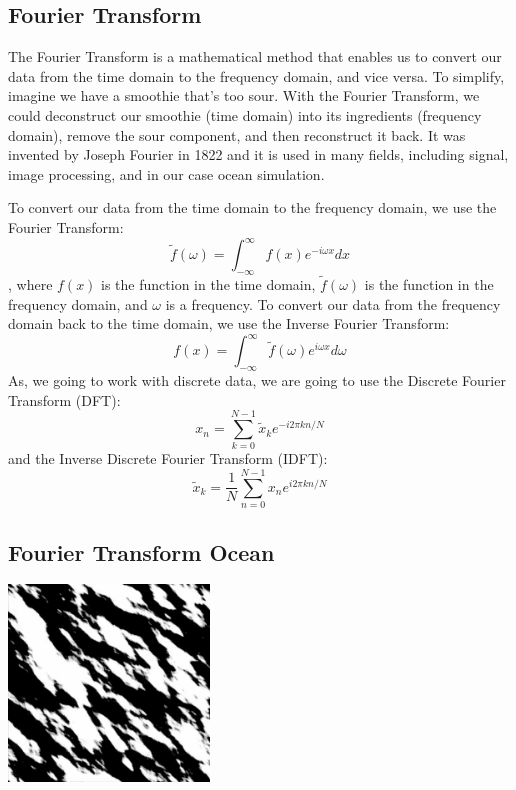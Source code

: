 \subsection{Fourier Transform}
The Fourier Transform is a mathematical method that enables us to convert our data from the time domain to the frequency domain, and vice versa. To simplify, imagine we have a smoothie that’s too sour. With the Fourier Transform, we could deconstruct our smoothie (time domain) into its ingredients (frequency domain), remove the sour component, and then reconstruct it back.
It was invented by Joseph Fourier\cite{fourier1822} in 1822 and it is used in many fields, including signal, image processing, and in our case ocean simulation.

To convert our data from the time domain to the frequency domain, we use the Fourier Transform:
\begin{equation}
\tilde{f}(\omega) = \int_{-\infty}^{\infty} f(x) e^{-i \omega x} dx
\end{equation}
, where $f(x)$ is the function in the time domain, $\tilde{f}(\omega)$ is the function in the frequency domain, and $\omega$ is a frequency.
To convert our data from the frequency domain back to the time domain, we use the Inverse Fourier Transform:
\begin{equation}
f(x) = \int_{-\infty}^{\infty} \tilde{f}(\omega) e^{i \omega x} d\omega
\end{equation}
As, we going to work with discrete data, we are going to use the Discrete Fourier Transform (DFT):
\begin{equation}
    x_n = \sum_{k=0}^{N-1} \tilde{x}_k e^{-i 2 \pi k n / N}
\end{equation}
and the Inverse Discrete Fourier Transform (IDFT):
\begin{equation}
    \tilde{x}_k = \frac{1}{N} \sum_{n=0}^{N-1} x_n e^{i 2 \pi k n / N}
    \label{eq:idft}
\end{equation}

\subsection{Fourier Transform Ocean}

\begin{minipage}{1\textwidth}
    \centering
    \includegraphics[width=0.40\textwidth]{"images/philips_height_map.png"}
    \label{fig:tessendorf_height}
\end{minipage}

